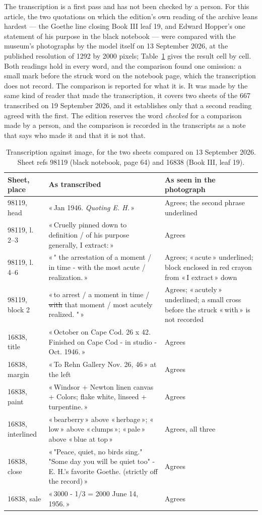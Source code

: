 \documentclass[11pt]{article}
\newcommand{\q}[1]{«\,#1\,»}
\begin{document}
The transcription is a first pass and has not been checked by a person. For this article, the two quotations on which the edition's own reading of the archive leans hardest — the Goethe line closing Book III leaf 19, and Edward Hopper's one statement of his purpose in the black notebook — were compared with the museum's photographs by the model itself on 13 September 2026, at the published resolution of 1292 by 2000 pixels; Table~\ref{tab:compare} gives the result cell by cell. Both readings hold in every word, and the comparison found one omission: a small mark before the struck word on the notebook page, which the transcription does not record. The comparison is reported for what it is. It was made by the same kind of reader that made the transcription, it covers two sheets of the 667 transcribed on 19 September 2026, and it establishes only that a second reading agreed with the first. The edition reserves the word \emph{checked} for a comparison made by a person, and the comparison is recorded in the transcripts as a note that says who made it and that it is not that.

\begin{table}[htbp]\centering\small
\caption{Transcription against image, for the two sheets compared on 13 September 2026. Sheet refs 98119 (black notebook, page 64) and 16838 (Book III, leaf 19).}\label{tab:compare}
\begin{tabular}{p{2.3cm}p{6.2cm}p{5.6cm}}\toprule
Sheet, place & As transcribed & As seen in the photograph\\\midrule
98119, head & \q{Jan 1946. \emph{Quoting E. H.}} & Agrees; the second phrase underlined\\
98119, l.\,2--3 & \q{Cruelly pinned down to definition / of his purpose generally, I extract:} & Agrees\\
98119, l.\,4--6 & \q{" the arrestation of a moment / in time - with the most acute / realization.} & Agrees; \q{acute} underlined; block enclosed in red crayon from \q{I extract} down\\
98119, block 2 & \q{to arrest / a moment in time / \sout{with} that moment / most acutely realized. "} & Agrees; \q{acutely} underlined; a small cross before the struck \q{with} is not recorded\\
16838, title & \q{October on Cape Cod. 26 x 42. Finished on Cape Cod - in studio - Oct. 1946.} & Agrees\\
16838, margin & \q{To Rehn Gallery Nov. 26, 46} at the left & Agrees\\
16838, paint & \q{Windsor + Newton linen canvas + Colors; flake white, linseed + turpentine.} & Agrees\\
16838, interlined & \q{bearberry} above \q{herbage}; \q{low} above \q{clumps}; \q{pale} above \q{blue at top} & Agrees, all three\\
16838, close & \q{"Peace, quiet, no birds sing." "Some day you will be quiet too" - E. H.'s favorite Goethe. (strictly off the record)} & Agrees\\
16838, sale & \q{3000 - 1/3 = 2000 June 14, 1956.} & Agrees\\\bottomrule
\end{tabular}
\end{table}
\end{document}
